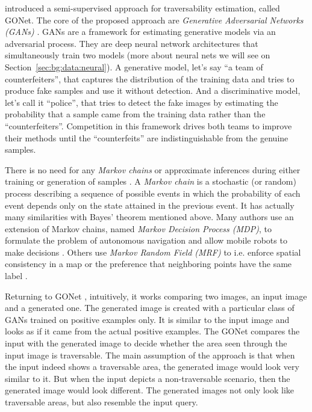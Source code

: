 \documentclass[12pt,a4paper,table,dvipsnames,tikz]{report}
\newcommand{\alleg}{\enquote}
\newcommand{\term}{\textit}
\newcommand{\acronym}{\MakeUppercase}
\begin{document}
	\citet{HiroseGonet} introduced a semi-supervised approach for traversability 
	estimation, called GONet. The core of the proposed approach are \term{Generative 
	Adversarial Networks (\acronym{gan}s)} \citep{Goodfellow}. \acronym{gan}s are a 
	framework for estimating generative models via an adversarial process. They 
	are deep neural network architectures that simultaneously train two models (more 
	about neural nets we will see on Section~\ref{sec:bg:data:neural}). A generative 
	model, let's say \alleg{a team of counterfeiters}, that captures the distribution 
	of the training data and tries to produce fake samples and use it without detection. 
	And a discriminative model, let's call it \alleg{police}, that tries to detect 
	the fake images by estimating the probability that a sample came from the training 
	data rather than the \alleg{counterfeiters}. Competition in this framework drives 
	both teams to improve their methods until the \alleg{counterfeits} are 
	indistinguishable from the genuine samples.
	\par
	There is no need for any \term{Markov chains} or approximate inferences during 
	either training or generation of samples \citep{Goodfellow}. A \term{Markov chain} 
	is a stochastic (or random) process describing a sequence of possible events in 
	which the probability of each event depends only on the state attained in the 
	previous event. It has actually many similarities with Bayes' theorem mentioned 
	above. Many authors use an extension of Markov chains, named \term{Markov Decision 
	Process (\acronym{mdp})}, to formulate the problem of autonomous navigation and 
	allow mobile robots to make decisions \citep{Wigness, Zhelo}. Others use 
	\term{Markov Random Field (\acronym{mrf})} \citep{Li} to i.e. enforce spatial 
	consistency in a map or the preference that neighboring points have the same label 
	\citep{Lalonde}.
	\par
	Returning to GONet \citep{HiroseGonet}, intuitively, it works comparing two images, 
	an input image and a generated one. The generated image is created with a 
	particular class of \acronym{gan}s trained on positive examples only. It is 
	similar to the input image and looks as if it came from the actual positive 
	examples. The GONet compares the input with the generated image to decide whether 
	the area seen through the input image is traversable. The main assumption of 
	the approach is that when the input indeed shows a traversable area, the 
	generated image would look very similar to it. But when the input depicts a 
	non-traversable scenario, then the generated image would look different.
	The generated images not only look like	traversable areas, but also resemble the 
	input query.
	\\\\
	
\end{document}
